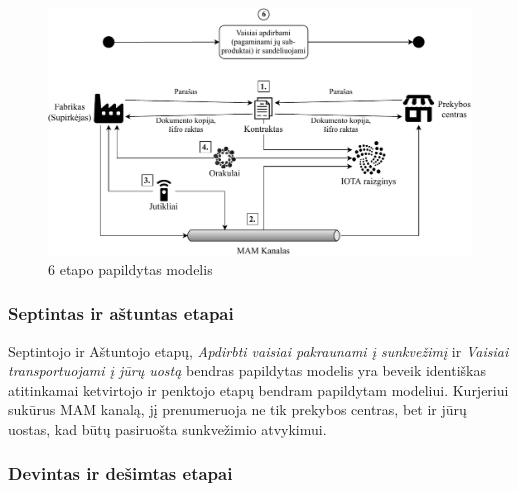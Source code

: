 \begin{figure}[H]
    \centering
    \includegraphics[scale=0.8]{images/iota-usecase-6}
    \caption{6 etapo papildytas modelis}
    \label{img:15}
\end{figure}




\subsubsection{Septintas ir aštuntas etapai} \label{subsection:uc-7-8}

Septintojo ir Aštuntojo etapų, \textit{Apdirbti vaisiai pakraunami į sunkvežimį} ir \textit{Vaisiai transportuojami į jūrų uostą} bendras papildytas modelis yra beveik identiškas atitinkamai ketvirtojo ir penktojo etapų bendram papildytam modeliui. Kurjeriui sukūrus MAM kanalą, jį prenumeruoja ne tik prekybos centras, bet ir jūrų uostas, kad būtų pasiruošta sunkvežimio atvykimui.




\subsubsection{Devintas ir dešimtas etapai} \label{subsection:uc-9-10}

